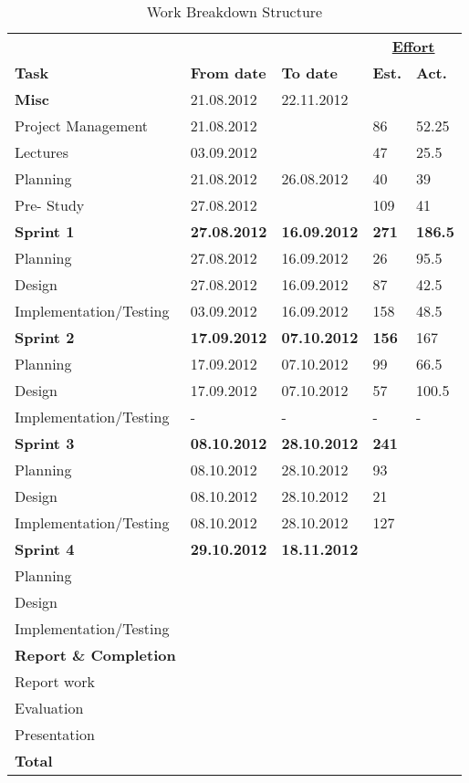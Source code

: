 

\begin{table}


\begin{tabular}{ l|l|l|l|l } \hline
&	 &	 &\multicolumn{2}{c}{\underline{\textbf{Effort}}}	 \\
\textbf{Task}	 & \textbf{From date}	 & \textbf{To date}	 & \textbf{Est.} & \textbf{Act.}	 \\ \hline \hline
\textbf{Misc} & 21.08.2012 & 22.11.2012 & & \\ \hline
Project Management & 21.08.2012 & & 86 & 52.25 \\
Lectures & 03.09.2012 & & 47 & 25.5\\
Planning & 21.08.2012 & 26.08.2012 & 40 & 39 \\
Pre- Study &27.08.2012  & & 109 & 41\\ \hline
\bf{Sprint 1}	&\bf{27.08.2012} & \bf{16.09.2012} & \bf{271} & \textbf{186.5} \\ \hline
Planning & 27.08.2012 & 16.09.2012 & 26 & 95.5 \\
Design & 27.08.2012 & 16.09.2012 & 87 & 42.5\\
Implementation/Testing & 03.09.2012 & 16.09.2012 & 158 & 48.5\\ \hline
\bf{Sprint 2} & \bf{17.09.2012} & \bf{07.10.2012} & \bf{156} & 167 \\ \hline
Planning & 17.09.2012 & 07.10.2012 & 99 & 66.5\\
Design& 17.09.2012 & 07.10.2012 & 57 & 100.5\\
Implementation/Testing & - & - & - & -\\ \hline
\bf{Sprint 3}	 & \bf{08.10.2012} & \bf{28.10.2012} & \bf{241} & \\ \hline
Planning & 08.10.2012 & 28.10.2012 & 93 & \\
Design & 08.10.2012 & 28.10.2012 & 21 & \\
Implementation/Testing & 08.10.2012 & 28.10.2012 & 127 & \\ \hline
\bf{Sprint 4}	& \bf{29.10.2012} & \bf{18.11.2012} & \bf{}  &  \\ \hline
Planning & & &  &	 \\
Design& & & & \\
Implementation/Testing & & &  & \\ \hline
\textbf{Report \& Completion} & & & & \\ \hline
Report work & & & & \\
Evaluation & & & & \\
Presentation && & & \\ \hline
\bf{Total} & & &\bf{}	& \\ \hline
\end{tabular}
\caption{Work Breakdown Structure} \label{table:wbs}
\end{table}
